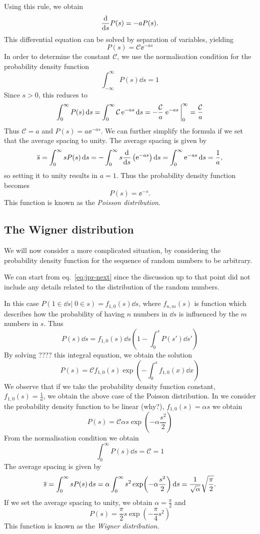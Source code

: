 \documentclass[../thesis.tex]{subfiles}
\theoremstyle{definition}
\begin{document}
Using this rule, we obtain
\[
  \dv{s}P(s) = -aP(s).
\]
This differential equation can be solved by separation of variables, yielding
\[
  P(s) = \mathcal{C} \ee^{-as}
\]
In order to determine the constant \(\mathcal{C}\), we use the normalisation condition
for the probability density function
\[
  \int_{-\infty}^{\infty} P(s) \dd{s} = 1
\]
Since \(s>0\), this reduces to
\[
  \int_{0}^{\infty} P(s) \dd{s} = \int_{0}^{\infty} \mathcal{C} \ee^{-as} \dd{s}
  = -\frac{\mathcal{C}}{a} \eval{\ee^{-as}}_0^{\infty} = \frac{\mathcal{C}}{a}
\]
Thus \(\mathcal{C} = a\) and \(P(s) = a \ee^{-as}\).
We can further simplify the formula if we set that the average spacing to unity.
The average spacing is given by
\[
  \overline{s} = \int_{0}^{\infty} s P(s) \dd{s}
  = -\int_{0}^{\infty} s \dv{s} \left( \operatorname{e}^{-as} \right) \dd{s}
  = \int_{0}^{\infty} \operatorname{e}^{-as} \dd{s} = \frac{1}{a},
\]
so setting it to unity results in \(a=1\).
Thus the probability density function becomes
\begin{equation}
  \label{eq:poisson-dist}
  P(s) = \ee^{-s}.
\end{equation}
This function is known as the \emph{Poisson distribution}.

\subsection{The Wigner distribution}

We will now consider a more complicated situation, by considering the
probability density function for the sequence of random numbers to be arbitrary.

We can start from eq.~\eqref{eq:jpr-next} since the discussion up to that point
did not include any details related to the distribution of the random numbers.

In this case \(P(1 \in \dd{s} |\; 0 \in s) = f_{1,0}(s) \dd{s}\), where
\(f_{n,m}(s)\) is function which describes how the probability of having $n$
numbers in \(\dd{s}\) is influenced by the $m$ numbers in $s$.
Thus
\[
  P(s)\dd{s}=f_{1,0}(s)\dd{s} \left( 1 - \int_0^s P(s') \dd{s'} \right)
\]
By solving {\color{red}\large????} this integral equation, we obtain the solution
\[
  P(s) = \mathcal{C} f_{1,0}(s) \exp(-\int_0^s f_{1,0}(x) \dd{x})
\]
We observe that if we take the probability density function constant,
\(f_{1,0}(s) = \frac{1}{a}\), we obtain the above case of the Poisson distribution.
In we consider the probability density function to be {\color{red}linear (why?)},
\(f_{1,0}(s) = \alpha s\) we obtain
\[
  P(s) = \mathcal{C} \alpha s \exp(-\alpha \frac{s^2}{2})
\]
From the normalisation condition we obtain
\[
  \int_{0}^{\infty} P(s) \dd{s} = \mathcal{C} = 1
\]
The average spacing is given by
\[
  \overline{s} = \int_{0}^{\infty} s P(s) \dd{s}
  = \alpha \int_{0}^{\infty} s^2 \exp(-\alpha \frac{s^2}{2}) \dd{s}
  = \frac{1}{\sqrt{\alpha}} \sqrt{\frac{\pi}{2}}.
\]
If we set the average spacing to unity, we obtain \(\alpha = \frac{\pi}{2}\)
and
\[
  P(s) = \frac{\pi}{2} s \exp(-\frac{\pi}{4} s^2)
\]
This function is known as the \emph{Wigner distribution}.
\end{document}
